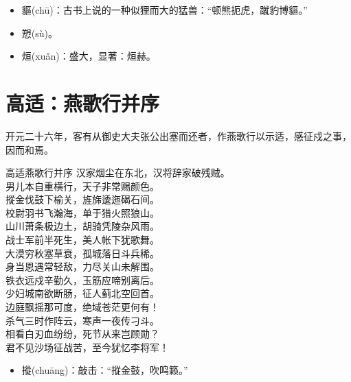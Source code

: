 \documentclass[12pt,oneside,a5paper]{book}
\begin{document}
\begin{itemize}
\item 貙(chū)：古书上说的一种似狸而大的猛兽：“顿熊扼虎，蹴豹博貙。”
\item 愬(sù)。
\item 烜(xuǎn)：盛大，显著：烜赫。
\end{itemize}

\chapter{高适：燕歌行并序}
开元二十六年，客有从御史大夫张公出塞而还者，作燕歌行以示适，感征戍之事，因而和焉。

\begin{poemzh}{高适}{燕歌行并序}
汉家烟尘在东北，汉将辞家破残贼。\\
男儿本自重横行，天子非常赐颜色。\\
摐金伐鼓下榆关，旌旆逶迤碣石间。\\
校尉羽书飞瀚海，单于猎火照狼山。\\
山川萧条极边土，胡骑凭陵杂风雨。\\
战士军前半死生，美人帐下犹歌舞。\\
大漠穷秋塞草衰，孤城落日斗兵稀。\\
身当恩遇常轻敌，力尽关山未解围。\\
铁衣远戍辛勤久，玉筋应啼别离后。\\
少妇城南欲断肠，征人蓟北空回首。\\
边庭飘摇那可度，绝域苍茫更何有！\\
杀气三时作阵云，寒声一夜传刁斗。\\
相看白刃血纷纷，死节从来岂顾勋？\\
君不见沙场征战苦，至今犹忆李将军！\\ 
\end{poemzh}

\begin{itemize}
\item 摐(chuāng)：敲击：“摐金鼓，吹鸣籁。”
\end{itemize}
\end{document}

